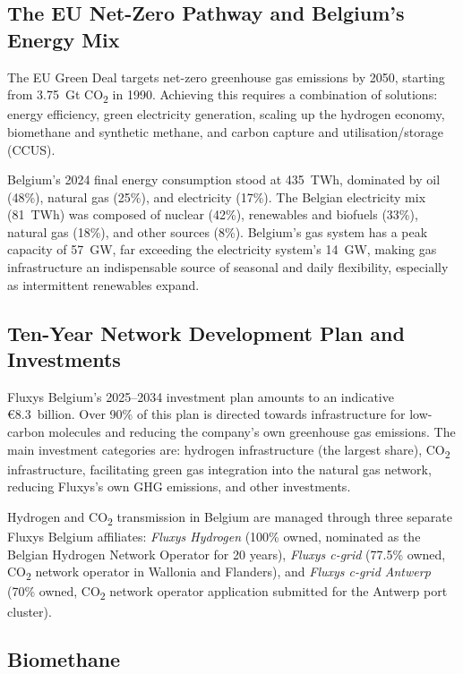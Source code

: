 \subsection{The EU Net-Zero Pathway and Belgium's Energy Mix}

The EU Green Deal targets net-zero greenhouse gas emissions by 2050, starting from 3.75~Gt CO\textsubscript{2} in 1990. Achieving this requires a combination of solutions: energy efficiency, green electricity generation, scaling up the hydrogen economy, biomethane and synthetic methane, and carbon capture and utilisation/storage (CCUS).

Belgium's 2024 final energy consumption stood at 435~TWh, dominated by oil (48\%), natural gas (25\%), and electricity (17\%). The Belgian electricity mix (81~TWh) was composed of nuclear (42\%), renewables and biofuels (33\%), natural gas (18\%), and other sources (8\%). Belgium's gas system has a peak capacity of 57~GW, far exceeding the electricity system's 14~GW, making gas infrastructure an indispensable source of seasonal and daily flexibility, especially as intermittent renewables expand.

\subsection{Ten-Year Network Development Plan and Investments}

Fluxys Belgium's 2025--2034 investment plan amounts to an indicative €8.3~billion. Over 90\% of this plan is directed towards infrastructure for low-carbon molecules and reducing the company's own greenhouse gas emissions. The main investment categories are: hydrogen infrastructure (the largest share), CO\textsubscript{2} infrastructure, facilitating green gas integration into the natural gas network, reducing Fluxys's own GHG emissions, and other investments.

Hydrogen and CO\textsubscript{2} transmission in Belgium are managed through three separate Fluxys Belgium affiliates: \textit{Fluxys Hydrogen} (100\% owned, nominated as the Belgian Hydrogen Network Operator for 20 years), \textit{Fluxys c-grid} (77.5\% owned, CO\textsubscript{2} network operator in Wallonia and Flanders), and \textit{Fluxys c-grid Antwerp} (70\% owned, CO\textsubscript{2} network operator application submitted for the Antwerp port cluster).

\subsection{Biomethane}

